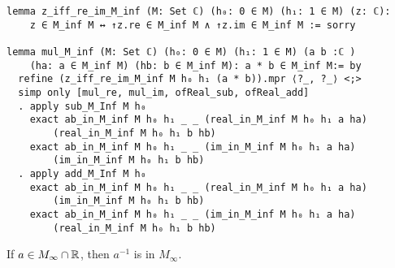 \begin{lstlisting}
lemma z_iff_re_im_M_inf (M: Set ℂ) (h₀: 0 ∈ M) (h₁: 1 ∈ M) (z: ℂ): 
    z ∈ M_inf M ↔ ↑z.re ∈ M_inf M ∧ ↑z.im ∈ M_inf M := sorry

lemma mul_M_inf (M: Set ℂ) (h₀: 0 ∈ M) (h₁: 1 ∈ M) (a b :ℂ ) 
    (ha: a ∈ M_inf M) (hb: b ∈ M_inf M): a * b ∈ M_inf M:= by
  refine (z_iff_re_im_M_inf M h₀ h₁ (a * b)).mpr ⟨?_, ?_⟩ <;>
  simp only [mul_re, mul_im, ofReal_sub, ofReal_add]
  . apply sub_M_Inf M h₀
    exact ab_in_M_inf M h₀ h₁ _ _ (real_in_M_inf M h₀ h₁ a ha) 
        (real_in_M_inf M h₀ h₁ b hb)
    exact ab_in_M_inf M h₀ h₁ _ _ (im_in_M_inf M h₀ h₁ a ha) 
        (im_in_M_inf M h₀ h₁ b hb)
  . apply add_M_Inf M h₀
    exact ab_in_M_inf M h₀ h₁ _ _ (real_in_M_inf M h₀ h₁ a ha) 
        (im_in_M_inf M h₀ h₁ b hb)
    exact ab_in_M_inf M h₀ h₁ _ _ (im_in_M_inf M h₀ h₁ a ha)
        (real_in_M_inf M h₀ h₁ b hb)
\end{lstlisting}

\begin{lemma}
    \label{lem:construction_inv}
    \leanok
    If $a \in M_{\infty}\cap\mathbb{R}$, then $a^{-1}$ is in  $M_{\infty}$.
\end{lemma}

